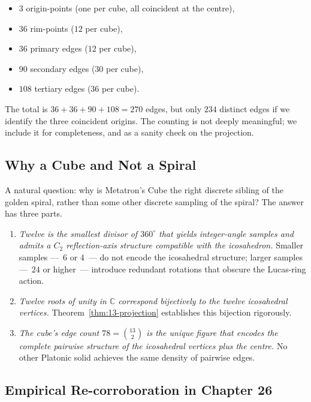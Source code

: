 \begin{itemize}
\item $3$ origin-points (one per cube, all coincident at the centre),
\item $36$ rim-points ($12$ per cube),
\item $36$ primary edges ($12$ per cube),
\item $90$ secondary edges ($30$ per cube),
\item $108$ tertiary edges ($36$ per cube).
\end{itemize}

The total is $36 + 36 + 90 + 108 = 270$ edges, but only $234$
distinct edges if we identify the three coincident origins. The
counting is not deeply meaningful; we include it for
completeness, and as a sanity check on the projection.

\subsection{Why a Cube and Not a Spiral}
\label{fa_13:sec:13-cube-vs-spiral}

A natural question: why is Metatron's Cube the right discrete
sibling of the golden spiral, rather than some other discrete
sampling of the spiral? The answer has three parts.

\begin{enumerate}
\item \emph{Twelve is the smallest divisor of $360^{\circ}$ that
  yields integer-angle samples and admits a $C_{2}$
  reflection-axis structure compatible with the icosahedron.}
  Smaller samples ---~$6$ or $4$~--- do not encode the icosahedral
  structure; larger samples ---~$24$ or higher~--- introduce
  redundant rotations that obscure the Lucas-ring action.
\item \emph{Twelve roots of unity in $\mathbb{C}$ correspond
  bijectively to the twelve icosahedral vertices.}
  Theorem~\ref{thm:13-projection} establishes this bijection
  rigorously.
\item \emph{The cube's edge count $78 = \binom{13}{2}$ is the
  unique figure that encodes the complete pairwise structure of
  the icosahedral vertices plus the centre.} No other Platonic
  solid achieves the same density of pairwise edges.
\end{enumerate}

\subsection{Empirical Re-corroboration in Chapter 26}
\label{fa_13:sec:13-emp-26}

